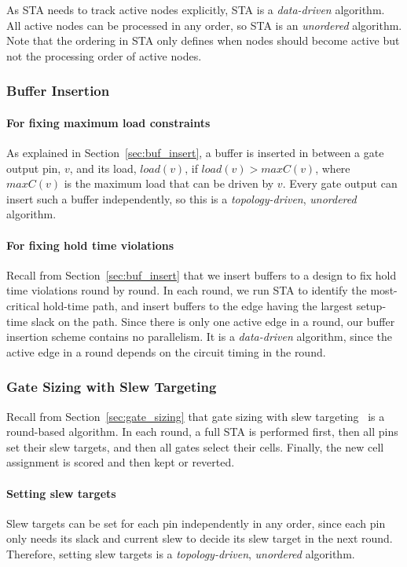 As STA needs to track active nodes explicitly, STA is a {\em data-driven} algorithm. All active nodes can be processed in any order, so STA is an {\em unordered} algorithm. Note that the ordering in STA only defines when nodes should become active but not the processing order of active nodes.

\subsubsection{Buffer Insertion}

\paragraph{For fixing maximum load constraints} As explained in Section~\ref{sec:buf_insert}, a buffer is inserted in between a gate output pin, $v$, and its load, $load(v)$, if $load(v) > maxC(v)$, where $maxC(v)$ is the maximum load that can be driven by $v$.
Every gate output can insert such a buffer independently, so this is a {\em topology-driven}, {\em unordered} algorithm.

\paragraph{For fixing hold time violations} Recall from Section~\ref{sec:buf_insert} that we insert buffers to a design to fix hold time violations round by round. In each round, we run STA to identify the most-critical hold-time path, and insert buffers to the edge having the largest setup-time slack on the path. Since there is only one active edge in a round, our buffer insertion scheme contains no parallelism. It is a {\em data-driven} algorithm, since the active edge in a round depends on the circuit timing in the round.

\subsubsection{Gate Sizing with Slew Targeting}

Recall from Section~\ref{sec:gate_sizing} that gate sizing with slew targeting~\cite{Held:Gate} is a round-based algorithm. In each round, a full STA is performed first, then all pins set their slew targets, and then all gates select their cells. Finally, the new cell assignment is scored and then kept or reverted.

\paragraph{Setting slew targets} Slew targets can be set for each pin independently in any order, since each pin only needs its slack and current slew to decide its slew target in the next round. Therefore, setting slew targets is a {\em topology-driven}, {\em unordered} algorithm.

